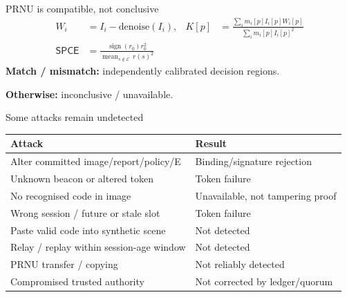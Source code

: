\begin{frame}[noframenumbering]{PRNU is compatible, not conclusive}
\begin{align*}
W_i &= I_i-\mathrm{denoise}(I_i), &
K[p] &= \frac{\sum_i m_i[p]I_i[p]W_i[p]}{\sum_i m_i[p]I_i[p]^2}\\[0.35cm]
\mathsf{SPCE} &= \frac{\operatorname{sign}(r_0)r_0^2}
{\operatorname{mean}_{s\notin\mathcal E}\,r(s)^2}
\end{align*}
\vspace{0.25cm}
\textbf{Match / mismatch:} independently calibrated decision regions.\par
\textbf{Otherwise:} inconclusive / unavailable.\par

\vfill
{}
\end{frame}

\begin{frame}[noframenumbering]{Some attacks remain undetected}
\renewcommand{\arraystretch}{1.3}
\begin{tabular}{@{}>{\raggedright\arraybackslash}p{7.7cm}>{\raggedright\arraybackslash}p{5cm}@{}}
\textbf{Attack} & \textbf{Result}\\\hline
Alter committed image/report/policy/E & Binding/signature rejection\\
Unknown beacon or altered token & Token failure\\
No recognised code in image & Unavailable, not tampering proof\\
Wrong session / future or stale slot & Token failure\\
Paste valid code into synthetic scene & Not detected\\
Relay / replay within session-age window & Not detected\\
PRNU transfer / copying & Not reliably detected\\
Compromised trusted authority & Not corrected by ledger/quorum\\
\end{tabular}\par
\vfill
{}
\end{frame}

